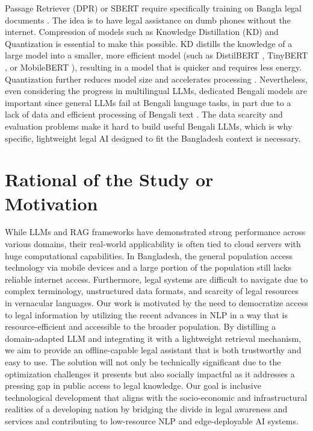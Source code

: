 Passage Retriever (DPR) or SBERT require specifically training on Bangla legal documents \cite{reimers2019sentencebertsentenceembeddingsusing}. The idea is to have legal assistance on dumb phones without the internet. Compression of models such as Knowledge Distillation (KD) and Quantization is essential to make this possible. KD distills the knowledge of a large model into a smaller, more efficient model (such as DistilBERT \cite{sanh2020distilbertdistilledversionbert}, TinyBERT \cite{jiao2020tinybertdistillingbertnatural}, or MobileBERT \cite{sun2020mobilebertcompacttaskagnosticbert}), resulting in a model that is quicker and requires less energy. Quantization further reduces model size and accelerates processing \cite{10.1145/3644815.3644966}. Nevertheless, even considering the progress in multilingual LLMs, dedicated Bengali models are important since general LLMs fail at Bengali language tasks, in part due to a lack of data and efficient processing of Bengali text \cite{mahfuz2024latetrainearlyuse,unknown}. The data scarcity and evaluation problems make it hard to build useful Bengali LLMs, which is why specific, lightweight legal AI designed to fit the Bangladesh context is necessary.


\section{Rational of the Study or Motivation}


While LLMs and RAG frameworks have demonstrated strong performance across various domains, their real-world applicability is often tied to cloud servers with huge computational capabilities. In Bangladesh, the general population access technology via mobile devices and a large portion of the population still lacks reliable internet access. Furthermore, legal systems are difficult to navigate due to complex terminology, unstructured data formats, and scarcity of legal resources in vernacular languages.
Our work is motivated by the need to democratize access to legal information by utilizing the recent advances in NLP in a way that is resource-efficient and accessible to the broader population. By distilling a domain-adapted LLM and integrating it with a lightweight retrieval mechanism, we aim to provide an offline-capable legal assistant that is both trustworthy and easy to use. The solution will not only be technically significant due to the optimization challenges it presents but also socially impactful as it addresses a pressing gap in public access to legal knowledge. Our goal is inclusive technological development that aligns with the socio-economic and infrastructural realities of a developing nation by bridging the divide in legal awareness and services and contributing to low-resource NLP and edge-deployable AI systems.

